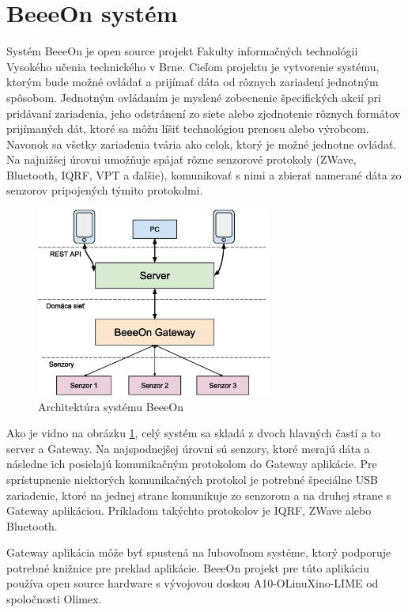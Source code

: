 \newpage
\section{BeeeOn systém}
Systém BeeeOn je open source projekt Fakulty informačných technológii Vysokého učenia technického v Brne. Cieľom projektu je vytvorenie systému, ktorým bude možné ovládať a prijímať dáta od rôznych zariadení jednotným spôsobom. Jednotným ovládaním je myslené zobecnenie špecifických akcií pri pridávaní zariadenia, jeho odstránení zo siete alebo zjednotenie rôznych formátov prijímaných dát, ktoré sa môžu líšiť technológiou prenosu alebo výrobcom. Navonok sa všetky zariadenia tvária ako celok, ktorý je možné jednotne ovládať. Na najnižšej úrovni umožňuje spájať rôzne senzorové protokoly (ZWave, Bluetooth, IQRF, VPT a ďalšie), komunikovať s nimi a zbierať namerané dáta zo senzorov pripojených týmito protokolmi.

\begin{figure}[H]
	\centering
	\includegraphics[width=220pt]{images/architektura.eps} 
	\caption{Architektúra systému BeeeOn}
	\label{architektura}
\end{figure}

Ako je vidno na obrázku \ref{architektura}, celý systém sa skladá z dvoch hlavných častí a to server a Gateway. Na najspodnejšej úrovni sú senzory, ktoré merajú dáta a následne ich posielajú komunikačným protokolom do Gateway aplikácie. Pre sprístupnenie niektorých komunikačných protokol je potrebné špeciálne USB zariadenie, ktoré na jednej strane komunikuje zo senzorom a na druhej strane s Gateway aplikáciou. Príkladom takýchto protokolov je IQRF, ZWave alebo Bluetooth. 

Gateway aplikácia môže byť spustená na ľubovoľnom systéme, ktorý podporuje potrebné knižnice pre preklad aplikácie. BeeeOn projekt pre túto aplikáciu používa open source hardware s vývojovou doskou A10-OLinuXino-LIME od spoločnosti Olimex. 

